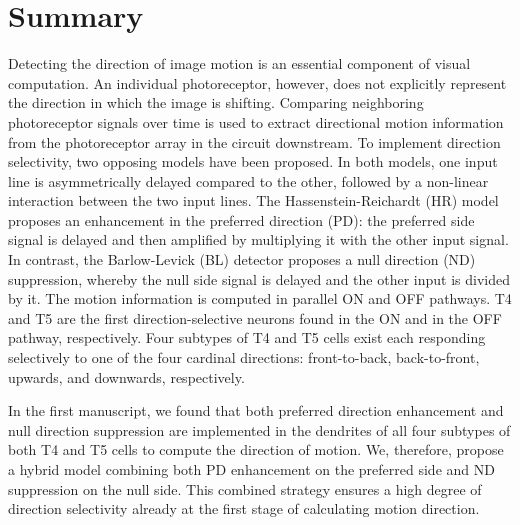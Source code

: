 
\begingroup
\let\clearpage\relax
\let\cleardoublepage\relax
\let\cleardoublepage\relax

\chapter*{Summary}

Detecting the direction of image motion is an essential component of visual computation. An individual photoreceptor, however, does not explicitly represent the direction in which the image is shifting. Comparing neighboring photoreceptor signals over time is used to extract directional motion information from the photoreceptor array in the circuit downstream. To implement direction selectivity, two opposing models have been proposed. In both models, one input line is asymmetrically delayed compared to the other, followed by a non-linear interaction between the two input lines. The Hassenstein-Reichardt (HR) model proposes an enhancement in the preferred direction (PD): the preferred side signal is delayed and then amplified by multiplying it with the other input signal. In contrast, the Barlow-Levick (BL) detector proposes a null direction (ND) suppression, whereby the null side signal is delayed and the other input is divided by it. The motion information is computed in parallel ON and OFF pathways. T4 and T5 are the first direction-selective neurons found in the ON and in the OFF pathway, respectively. Four subtypes of T4 and T5 cells exist each responding selectively to one of the four cardinal directions: front-to-back, back-to-front, upwards, and downwards, respectively.

In the first manuscript, we found that both preferred direction enhancement and null direction suppression are implemented in the dendrites of all four subtypes of both T4 and T5 cells to compute the direction of motion. We, therefore, propose a hybrid model combining both PD enhancement on the preferred side and ND suppression on the null side. This combined strategy ensures a high degree of direction selectivity already at the first stage of calculating motion direction. 

